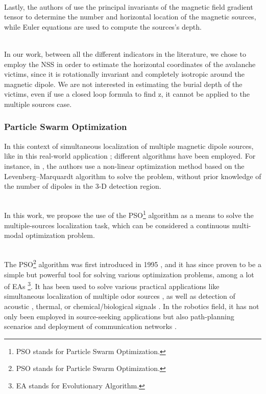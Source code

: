 \documentclass[main]{subfiles}
\begin{document}
\noindent\\
Lastly, the authors of \cite{multiple_spacecraft} use 
the principal invariants of the magnetic field gradient tensor
to determine the number and horizontal location of the magnetic sources, 
while Euler equations are used to compute the sources's depth.

\noindent\\
In our work, between all the different indicators in the literature,
we chose to employ the NSS in order to estimate the 
horizontal coordinates of the avalanche victims, 
since it is rotationally invariant and completely isotropic 
around the magnetic dipole.
We are not interested in estimating the burial depth of the victims,
even if \cite{not_import_formula_z} use a closed loop formula to find z,
it cannot be applied to the multiple sources case.


\subsubsection{Particle Swarm Optimization}
In this context of simultaneous localization of multiple magnetic 
dipole sources, like in this real-world application \cite{real_application}; 
different algorithms have been employed.
For instance, in \cite{DetectionMultiplMagnetiDipoleSources}, the authors
use a non-linear optimization method based on the Levenberg–Marquardt algorithm
to solve the problem, without prior knowledge of the number of 
dipoles in the 3-D detection region.

\noindent\\In this work, we propose the use of the PSO\footnote{PSO stands for Particle Swarm Optimization.} 
algorithm as a means to solve the multiple-sources localization task, 
which can be considered a continuous multi-modal optimization problem.

\noindent\\
The PSO\footnote{PSO stands for Particle Swarm Optimization.} algorithm 
was first introduced in 1995 \cite{PSO_original}, and it has since proven to be 
a simple but powerful tool for solving various optimization problems\cite{PSO_IMPORTANT},
among a lot of EAs \footnote{EA stands for Evolutionary Algorithm.}.
It has been used to solve various practical applications like simultaneous
localization of multiple odor sources \cite{12}, as well as detection of acoustic 
\cite{PSO_acustic}, thermal, or chemical/biological signals \cite{3}.
In the robotics field, it has not only been employed in source-seeking 
applications but also path-planning scenarios \cite{PSO_for_path_planning} and
deployment of communication networks \cite{PSO_for_communication}.
\end{document}
